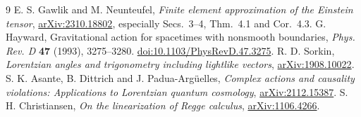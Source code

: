 \documentclass[11pt]{article}
\begin{document}
\begin{thebibliography}{9}
 E. S. Gawlik and M. Neunteufel, \emph{Finite element approximation of the Einstein tensor}, \href{https://arxiv.org/abs/2310.18802}{arXiv:2310.18802}, especially Secs.~3--4, Thm.~4.1 and Cor.~4.3.
 G. Hayward, Gravitational action for spacetimes with nonsmooth boundaries, \emph{Phys. Rev. D} \textbf{47} (1993), 3275--3280. \href{https://doi.org/10.1103/PhysRevD.47.3275}{doi:10.1103/PhysRevD.47.3275}.
 R. D. Sorkin, \emph{Lorentzian angles and trigonometry including lightlike vectors}, \href{https://arxiv.org/abs/1908.10022}{arXiv:1908.10022}.
 S. K. Asante, B. Dittrich and J. Padua-Arg\"uelles, \emph{Complex actions and causality violations: Applications to Lorentzian quantum cosmology}, \href{https://arxiv.org/abs/2112.15387}{arXiv:2112.15387}.
 S. H. Christiansen, \emph{On the linearization of Regge calculus}, \href{https://arxiv.org/abs/1106.4266}{arXiv:1106.4266}.
\end{thebibliography}
\end{document}
